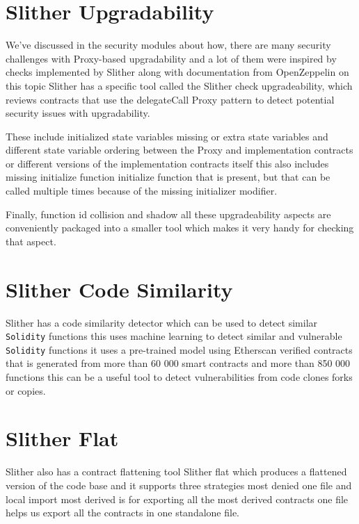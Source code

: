 \section{Slither Upgradability}

We've discussed in the security modules about how, there are many security challenges with Proxy-based upgradability and a lot of them were inspired by checks implemented by Slither along with documentation from OpenZeppelin on this topic Slither has a specific tool called the Slither check upgradeability, which reviews contracts that use the delegateCall Proxy pattern to detect potential security issues with upgradability.

These include initialized state variables missing or extra state variables and different state variable ordering between the Proxy and implementation contracts or different versions of the implementation contracts itself this also includes missing initialize function initialize function that is present, but that can be called multiple times because of the missing initializer modifier. 

Finally, function id collision and shadow all these upgradeability aspects are conveniently packaged into a smaller tool which makes it very handy for checking that aspect.

\section{Slither Code Similarity}

Slither has a code similarity detector which can be used to detect similar \verb|Solidity| functions this uses machine learning to detect similar and vulnerable \verb|Solidity| functions it uses a pre-trained model using Etherscan verified contracts that is generated from more than 60 000 smart contracts and more than 850 000 functions this can be a useful tool to detect vulnerabilities from code clones forks or copies.

\section{Slither Flat}

Slither also has a contract flattening tool Slither flat which produces a flattened version of the code base and it supports three strategies most denied one file and local import most derived is for exporting all the most derived contracts one file helps us export all the contracts in one standalone file. 

